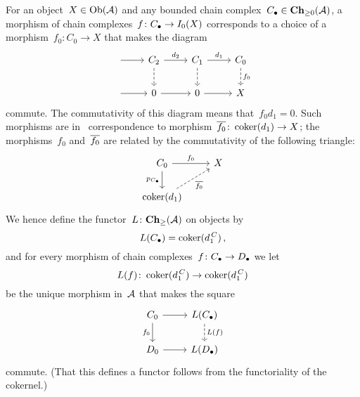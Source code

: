 \section{}





\subsection{}

For an object~$X \in \operatorname{Ob}(\mathcal{A})$ and any bounded chain complex~$C_\bullet \in \mathbf{Ch}_{\geq 0}(\mathcal{A})$, a morphism of chain complexes~$f \colon C_\bullet \to I_0(X)$ corresponds to a choice of a morphism~$f_0 \colon C_0 \to X$ that makes the diagram
\[
  \begin{tikzcd}
      {}
      \arrow{r}
    & C_2
      \arrow{r}[above]{d_2}
      \arrow[dashed]{d}
    & C_1
      \arrow{r}[above]{d_1}
      \arrow[dashed]{d}
    & C_0
      \arrow[dashed]{d}[right]{f_0}
    \\
      {}
      \arrow{r}
    & 0
      \arrow{r}
    & 0
      \arrow{r}
    & X
  \end{tikzcd}
\]
commute.
The commutativity of this diagram means that~$f_0 d_1 = 0$.
Such morphisms are in~{\onetoone} correspondence to morphism~$\overline{f_0} \colon \operatorname{coker}(d_1) \to X$;
the morphisms~$f_0$ and~$\overline{f_0}$ are related by the commutativity of the following triangle:
\[
  \begin{tikzcd}
      C_0
      \arrow{r}[above]{f_0}
      \arrow{d}[left]{p_{\Ccc}}
    & X
      \\
      \coker(d_1)
      \arrow[dashed]{ur}[below right]{\induced{f_0}}
    & {}
  \end{tikzcd}
\]
We hence define the functor~$L \colon \mathbf{Ch}_{\geq }(\mathcal{A})$ on objects by
\[
  L(C_\bullet)
  =
  \operatorname{coker}(d^{\,C}_1) \,,
\]
and for every morphism of chain complexes~$f \colon C_\bullet \to D_\bullet$ we let
\[
  L(f)
  \colon
  \operatorname{coker}(d^{\,C}_1)
  \to
  \operatorname{coker}(d^{\,C}_1)
\]
be the unique morphism in~$\mathcal{A}$ that makes the square
\[
  \begin{tikzcd}
      C_0
      \arrow{r}
      \arrow{d}[left]{f_0}
    & L(\Ccc)
      \arrow[dashed]{d}[right]{L(f)}
    \\
      D_0
      \arrow{r}
    & L(\Dcc)
  \end{tikzcd}
\]
commute.
(That this defines a functor follows from the functoriality of the cokernel.)

